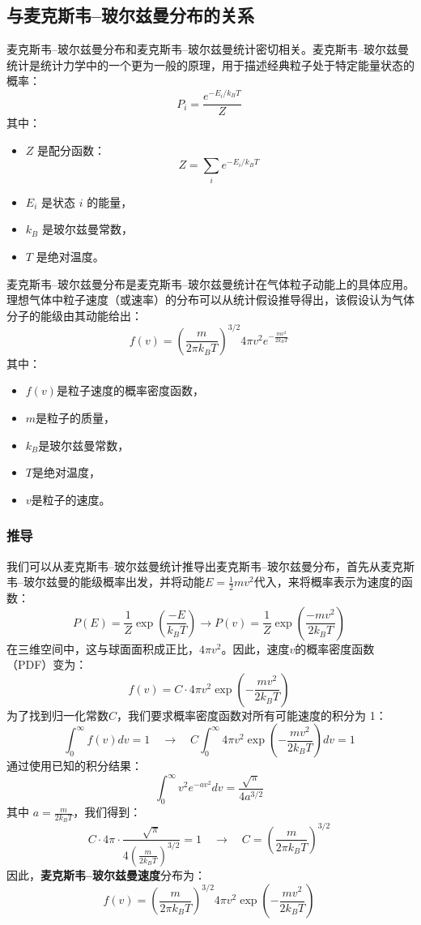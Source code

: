 \subsection{与麦克斯韦–玻尔兹曼分布的关系}  
麦克斯韦–玻尔兹曼分布和麦克斯韦–玻尔兹曼统计密切相关。麦克斯韦–玻尔兹曼统计是统计力学中的一个更为一般的原理，用于描述经典粒子处于特定能量状态的概率：
\[
P_i = \frac{e^{-E_i / k_B T}}{Z}~
\]
其中：
\begin{itemize}
\item \( Z \) 是配分函数：
  \[
  Z = \sum_i e^{-E_i / k_B T}~
  \]
\item \( E_i \) 是状态 \( i \) 的能量，
\item \( k_B \) 是玻尔兹曼常数，
\item \( T \) 是绝对温度。
\end{itemize}
麦克斯韦–玻尔兹曼分布是麦克斯韦–玻尔兹曼统计在气体粒子动能上的具体应用。理想气体中粒子速度（或速率）的分布可以从统计假设推导得出，该假设认为气体分子的能级由其动能给出：
\[
f(v) = \left( \frac{m}{2 \pi k_B T} \right)^{3/2} 4 \pi v^2 e^{-\frac{m v^2}{2 k_B T}}~
\]
其中：
\begin{itemize}
\item \( f(v) \)是粒子速度的概率密度函数，
\item \( m \)是粒子的质量，
\item \( k_B \)是玻尔兹曼常数，
\item \( T \)是绝对温度，
\item \( v \)是粒子的速度。
\end{itemize}
\subsubsection{推导}
我们可以从麦克斯韦–玻尔兹曼统计推导出麦克斯韦–玻尔兹曼分布，首先从麦克斯韦–玻尔兹曼的能级概率出发，并将动能\( E = \frac{1}{2} m v^2 \)代入，来将概率表示为速度的函数：
\[
P(E) = \frac{1}{Z} \exp \left( \frac{-E}{k_B T} \right) \rightarrow P(v) = \frac{1}{Z} \exp \left( \frac{-m v^2}{2 k_B T} \right)~
\]
在三维空间中，这与球面面积成正比，\( 4 \pi v^2 \)。因此，速度\( v \)的概率密度函数（PDF）变为：
\[
f(v) = C \cdot 4 \pi v^2 \exp \left( -\frac{m v^2}{2 k_B T} \right)~
\]
为了找到归一化常数\( C \)，我们要求概率密度函数对所有可能速度的积分为 1：
\[
\int_0^\infty f(v) dv = 1 \quad \rightarrow \quad C \int_0^\infty 4 \pi v^2 \exp \left( -\frac{m v^2}{2 k_B T} \right) dv = 1~
\]
通过使用已知的积分结果：
\[
\int_0^\infty v^2 e^{-a v^2} dv = \frac{\sqrt{\pi}}{4 a^{3/2}}~
\]
其中 \( a = \frac{m}{2 k_B T} \)，我们得到：
\[
C \cdot 4 \pi \cdot \frac{\sqrt{\pi}}{4 \left( \frac{m}{2 k_B T} \right)^{3/2}} = 1 \quad \rightarrow \quad C = \left( \frac{m}{2 \pi k_B T} \right)^{3/2}~
\]
因此，\textbf{麦克斯韦–玻尔兹曼速度}分布为：
\[
f(v) = \left( \frac{m}{2 \pi k_B T} \right)^{3/2} 4 \pi v^2 \exp \left( -\frac{m v^2}{2 k_B T} \right)~
\]
